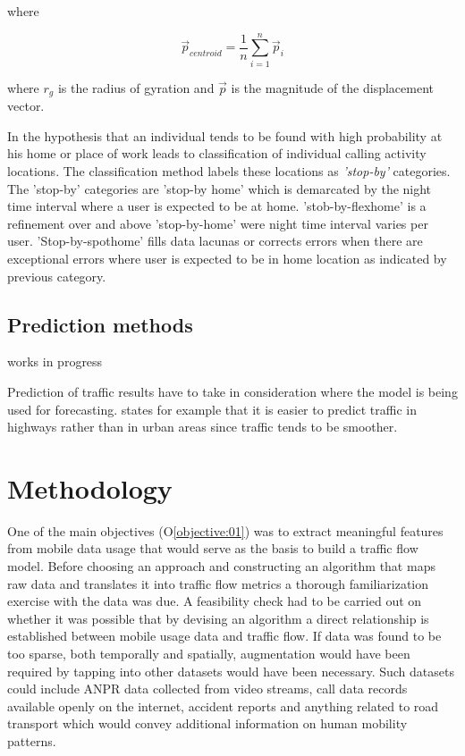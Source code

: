 \documentclass[12pt, a4paper]{report}
\theoremstyle{definition}
\theoremstyle{definition}%
\theoremstyle{definition}%
\theoremstyle{definition}%
\theoremstyle{definition}%
\theoremstyle{definition}%
\begin{document}
where 

\begin{equation}
{\stackrel{\to }{p}}_{centroid} = \frac{1}{n}\sum _{i=1}^{n}{\stackrel{\to }{p}}_{i}
\end{equation}

where $r_{g}$ is the radius of gyration and ${\stackrel{\to }{p}}$ is the magnitude of the displacement vector.   

In \cite{Hoteit2016} the hypothesis that an individual tends to be found with high probability at his home or place of work leads to classification of individual calling activity locations. The classification method labels these locations as \textit{'stop-by'} categories. The 'stop-by' categories are 'stop-by home' which is demarcated by the night time interval where a user is expected to be at home. 'stob-by-flexhome' is a refinement over and above 'stop-by-home' were night time interval varies per user. 'Stop-by-spothome' fills data lacunas or corrects errors when there are exceptional errors where user is expected to be in home location as indicated by previous category.


\section{Prediction methods}

{works in progress}

Prediction of traffic results have to take in consideration where the model is being used for forecasting. \cite{Sommer2013} states for example that it is easier to predict traffic in highways rather than in urban areas since traffic tends to be smoother.




\chapter{Methodology} \label{chapter:methodology}

One of the main objectives (O\ref{objective:01}) was to extract meaningful features from mobile data usage that would serve as the basis to build a traffic flow model. Before choosing an approach and constructing an algorithm that maps raw data and translates it into traffic flow metrics a thorough familiarization exercise with the data was due. A feasibility check had to be carried out on whether it was possible that by devising an algorithm a direct relationship is established between mobile usage data and traffic flow. If data was found to be too sparse, both temporally and spatially,  augmentation would have been required by tapping into other datasets would have been necessary. Such  datasets could include ANPR data collected from video streams, call data records available openly on the internet, accident reports and anything related to road transport which would convey additional information on human mobility patterns. 
\end{document}
